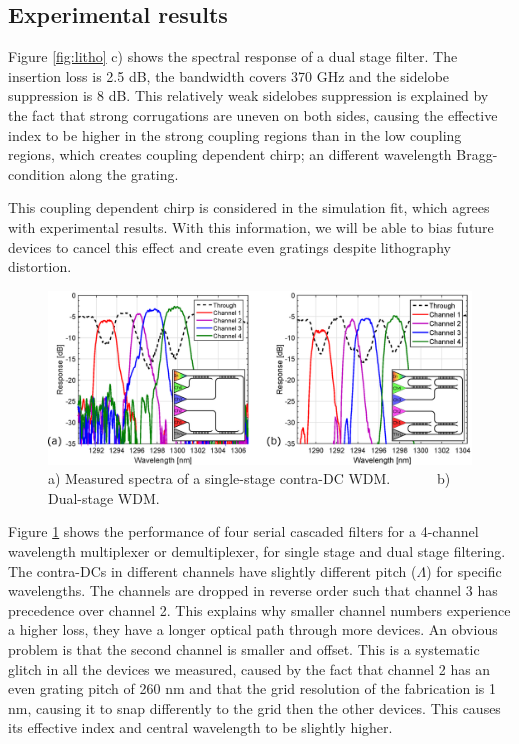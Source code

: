 \documentclass[letterpaper,10pt]{article}
\begin{document}
	\subsection{Experimental results}
	Figure \ref{fig:litho} c) shows the spectral response of a dual stage filter. The insertion loss is 2.5 dB, the bandwidth covers 370 GHz and the sidelobe suppression is 8 dB. This relatively weak sidelobes suppression is explained by the fact that strong corrugations are uneven on both sides, causing the effective index to be higher in the strong coupling regions than in the low coupling regions, which creates coupling dependent chirp; an different wavelength Bragg-condition along the grating. 
	
	This coupling dependent chirp is considered in the simulation fit, which agrees with experimental results. With this information, we will be able to bias future devices to cancel this effect and create even gratings despite lithography distortion.
	
	\begin{figure}[htbp]
		\centering
		\includegraphics[width=.8\columnwidth]{WDM}
		\caption{a) Measured spectra of a single-stage contra-DC WDM. ~~~~~~b) Dual-stage WDM.}
		\label{fig:WDM}
	\end{figure}
	
	Figure \ref{fig:WDM} shows the performance of four serial cascaded filters for a 4-channel wavelength multiplexer or demultiplexer, for single stage and dual stage filtering. The contra-DCs in different channels have slightly different pitch ($\Lambda$) for specific wavelengths. The channels are dropped in reverse order such that channel 3 has precedence over channel 2. This explains why smaller channel numbers experience a higher loss, they have a longer optical path through more devices. An obvious problem is that the second channel is smaller and offset. This is a systematic glitch in all the devices we measured, caused by the fact that channel 2 has an even grating pitch of 260 nm and that the grid resolution of the fabrication is 1 nm, causing it to snap differently to the grid then the other devices. This causes its effective index and central wavelength to be slightly higher.
	
\end{document}
